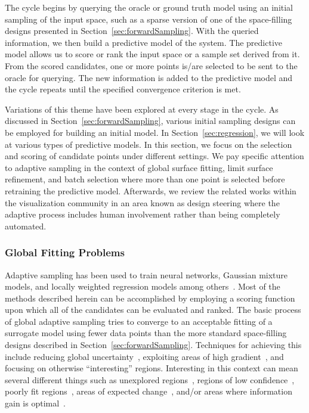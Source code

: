 The cycle begins by querying the oracle or ground truth model using an initial sampling of the input space, such as a sparse version of one of the space-filling designs presented in Section~\ref{sec:forwardSampling}.
%
With the queried information, we then build a predictive model of the system.
%
%
The predictive model allows us to score or rank the input space or a sample set derived from it.
%
From the scored candidates, one or more points is/are selected to be sent to the oracle for querying.
%
The new information is added to the predictive model and the cycle repeats until the specified convergence criterion is met.

Variations of this theme have been explored at every stage in the cycle.
%
As discussed in Section~\ref{sec:forwardSampling}, various initial sampling designs can be employed for building an initial model.
%
In Section~\ref{sec:regression}, we will look at various types of predictive models.
%
In this section, we focus on the selection and scoring of candidate points under different settings.
%
We pay specific attention to adaptive sampling in the context of global surface fitting, limit surface refinement, and batch selection where more than one point is selected before retraining the predictive model.
%
Afterwards, we review the related works within the visualization community in an area known as design steering where the adaptive process includes human involvement rather than being completely automated.

\subsubsection{Global Fitting Problems}

Adaptive sampling has been used to train neural networks, Gaussian mixture models, and locally weighted regression models among others~\cite{CohnGhahramaniJordan1996}.
%
Most of the methods described herein can be accomplished by employing a scoring function upon which all of the candidates can be evaluated and ranked.
%
The basic process of global adaptive sampling tries to converge to an acceptable fitting of a surrogate model using fewer data points than the more standard space-filling designs described in Section~\ref{sec:forwardSampling}.
%
Techniques for achieving this include reducing global uncertainty~\cite{CohnGhahramaniJordan1996,TongKoller2001}, exploiting areas of high gradient~\cite{MaljovecWangKupresanin2013}, and focusing on otherwise ``interesting'' regions.
%
Interesting in this context can mean several different things such as unexplored regions~\cite{Whitehead1991}, regions of low confidence~\cite{ThrunMoller1992}, poorly fit regions~\cite{LindenWeber1993}, areas of expected change~\cite{CohnAtlasLadner1990,CohnAtlasLadner1994}, and/or areas where information gain is optimal~\cite{Lam2008}.

